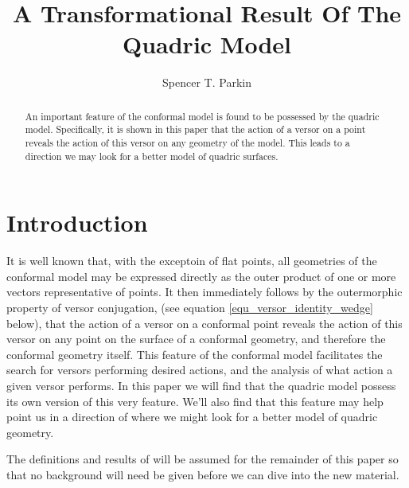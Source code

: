 \documentclass{birkjour}
\theoremstyle{definition}
\theoremstyle{remark}
\numberwithin{equation}{section}
\begin{document}
\title{A Transformational Result Of The Quadric Model}

\author{Spencer T. Parkin}
\address{%
2113 S. Claremont Dr.\\
Bountiful, Utah  84010\\
USA}





\begin{abstract}
An important feature of the conformal model is found
to be possessed by the quadric model.  Specifically, it is
shown in this paper that the action of a versor on a point
reveals the action of this versor on any geometry of the model.
This leads to a direction we may look for a better model of quadric surfaces.
\end{abstract}

\maketitle

\section{Introduction}

It is well known that, with the exceptoin of flat points, all geometries of
the conformal model may be expressed directly as the outer product
of one or more vectors representative of points.  It then immediately
follows by the outermorphic property of versor conjugation, (see
equation \eqref{equ_versor_identity_wedge} below), that the
action of a versor on a conformal point reveals the action of this versor
on any point on the surface of a conformal geometry, and therefore
the conformal geometry itself.  This feature of the conformal model
facilitates the search for versors performing desired actions, and the
analysis of what action a given versor performs.  In this paper we
will find that the quadric model possess its own version of this very feature.
We'll also find that this feature may help point us in a direction of where
we might look for a better model of quadric geometry.

The definitions and results of \cite{Parkin12} will be assumed for
the remainder of this paper so that no background will need be
given before we can dive into the new material.
\end{document}
